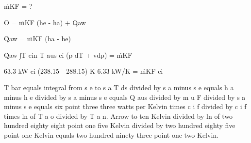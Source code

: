 ṁKF = ?  

O = ṁKF (he - ha) + Q̇aw  

Q̇aw = ṁKF (ha - he)  

Q̇aw  
∫T ein  
T aus ci (p dT + vdp) = ṁKF  

63.3 kW  
ci (238.15 - 288.15) K  
6.33 kW/K = ṁKF ci

T bar equals integral from s e to s a T ds divided by s a minus s e equals h a minus h e divided by s a minus s e equals Q aus divided by m u F divided by s a minus s e equals six point three three watts per Kelvin times c i f divided by c i f times ln of T a o divided by T a n. Arrow to ten Kelvin divided by ln of two hundred eighty eight point one five Kelvin divided by two hundred eighty five point one Kelvin equals two hundred ninety three point one two Kelvin.